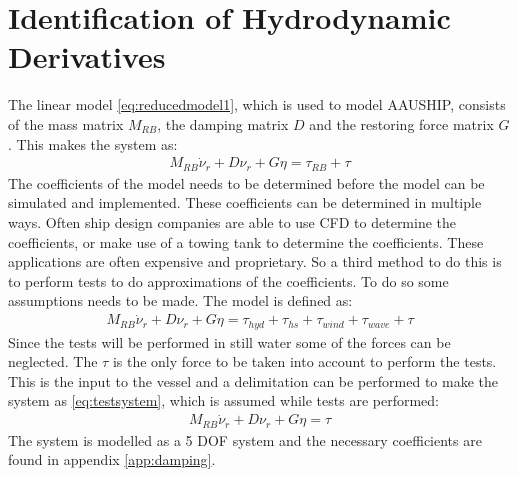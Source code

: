 \section{Identification of Hydrodynamic Derivatives}
\label{sec:hydrocoeff}
The linear model \eqref{eq:reducedmodel1}, which is used to model AAUSHIP, consists of the mass matrix $M_{RB}$, the damping matrix $D$ and the restoring force matrix $G$. This makes the system as:
\begin{align}
M_{RB} \dot \nu_r + D\nu_r + G\eta = \tau_{RB} + \tau
\label{eq:reducedmodel1}
\end{align}
The coefficients of the model needs to be determined before the model can be simulated and implemented. These coefficients can be determined in multiple ways. Often ship design companies are able to use \ac{CFD} to determine the coefficients, or make use of a towing tank to determine the coefficients. These applications are often expensive and proprietary. So a third method to do this is to perform tests to do approximations of the coefficients. To do so some assumptions needs to be made. The model is defined as:
\begin{align}
M_{RB} \dot \nu_r + D\nu_r + G\eta = \tau_{hyd} + \tau_{hs} + \tau_{wind} + \tau_{wave} + \tau
\end{align}
Since the tests will be performed in still water some of the forces can be neglected. The $\tau$ is the only force to be taken into account to perform the tests. This is the input to the vessel and a delimitation can be performed to make the system as \ref{eq:testsystem}, which is assumed while tests are performed:
\begin{align}
M_{RB} \dot \nu_r + D\nu_r + G\eta = \tau
\label{eq:testsystem}
\end{align}
The system is modelled as a 5 \ac{DOF} system and the necessary coefficients are found in appendix \ref{app:damping}.

